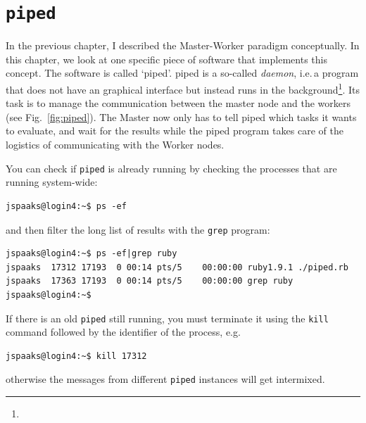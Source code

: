 \chapter{\texttt{piped}}

In the previous chapter, I described the Master-Worker paradigm conceptually. In this chapter, we look at one specific piece of software that implements this concept. The software is called `piped'. piped is a so-called \textit{daemon}, i.e.\,a program that does not have an graphical interface but instead runs in the background\footnote{}. Its task is to manage the communication between the master node and the workers (see Fig.~\ref{fig:piped}). The Master now only has to tell piped which tasks it wants to evaluate, and wait for the results while the piped program takes care of the logistics of communicating with the Worker nodes.

You can check if \lstinline[style=bashinline]{piped} is already running by checking the processes that are running system-wide:
\begin{lstlisting}[style=basic,style=bash] 
jspaaks@login4:~$ ps -ef
\end{lstlisting}
and then filter the long list of results with the \lstinline[style=bashinline]{grep} program:
\begin{lstlisting}[style=basic,style=bash]
jspaaks@login4:~$ ps -ef|grep ruby
jspaaks  17312 17193  0 00:14 pts/5    00:00:00 ruby1.9.1 ./piped.rb
jspaaks  17363 17193  0 00:14 pts/5    00:00:00 grep ruby
jspaaks@login4:~$ 
\end{lstlisting}

If there is an old \lstinline[style=bashinline]{piped} still running, you must terminate it using the \lstinline[style=bashinline]{kill} command followed by the identifier of the process, e.g.
\begin{lstlisting}[style=basic,style=bash]
jspaaks@login4:~$ kill 17312
\end{lstlisting}
otherwise the messages from different \lstinline[style=bashinline]{piped} instances will get intermixed.

